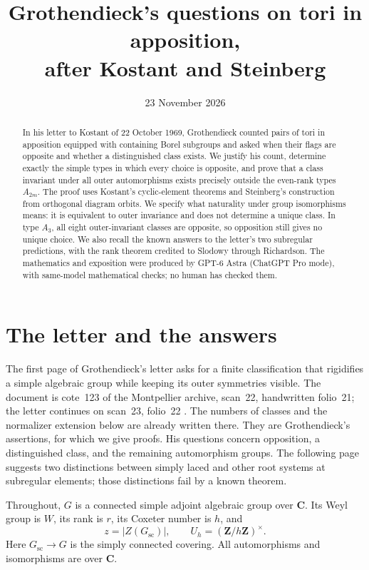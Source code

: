 \documentclass[11pt]{article}
\title{Grothendieck's questions on tori in apposition,\\ after Kostant and Steinberg}
\author{}
\date{23 November 2026}
\newcommand{\C}{\mathbf C}\newcommand{\Z}{\mathbf Z}\newcommand{\Q}{\mathbf Q}
\theoremstyle{definition}\newtheorem{definition}[theorem]{Definition}
\theoremstyle{remark}\newtheorem{remark}[theorem]{Remark}
\begin{document}
\maketitle
\begin{abstract}
In his letter to Kostant of 22 October 1969, Grothendieck counted pairs of tori in apposition equipped with containing Borel subgroups and asked when their flags are opposite and whether a distinguished class exists. We justify his count, determine exactly the simple types in which every choice is opposite, and prove that a class invariant under all outer automorphisms exists precisely outside the even-rank types $A_{2m}$. The proof uses Kostant's cyclic-element theorems and Steinberg's construction from orthogonal diagram orbits. We specify what naturality under group isomorphisms means: it is equivalent to outer invariance and does not determine a unique class. In type $A_3$, all eight outer-invariant classes are opposite, so opposition still gives no unique choice. We also recall the known answers to the letter's two subregular predictions, with the rank theorem credited to Slodowy through Richardson. The mathematics and exposition were produced by GPT-6 Astra (ChatGPT Pro mode), with same-model mathematical checks; no human has checked them.
\end{abstract}

\section{The letter and the answers}
The first page of Grothendieck's letter asks for a finite classification that rigidifies a simple algebraic group while keeping its outer symmetries visible. The document is cote~123 of the Montpellier archive, scan~22, handwritten folio~21; the letter continues on scan~23, folio~22 \citep{Grothendieck1969}. The numbers of classes and the normalizer extension below are already written there. They are Grothendieck's assertions, for which we give proofs. His questions concern opposition, a distinguished class, and the remaining automorphism groups. The following page suggests two distinctions between simply laced and other root systems at subregular elements; those distinctions fail by a known theorem.

Throughout, $G$ is a connected simple adjoint algebraic group over $\C$. Its Weyl group is $W$, its rank is $r$, its Coxeter number is $h$, and
\[
 z=|Z(G_{\mathrm{sc}})|,
 \qquad U_h=(\Z/h\Z)^\times.
\]
Here $G_{\mathrm{sc}}\to G$ is the simply connected covering. All automorphisms and isomorphisms are over $\C$.
\end{document}
